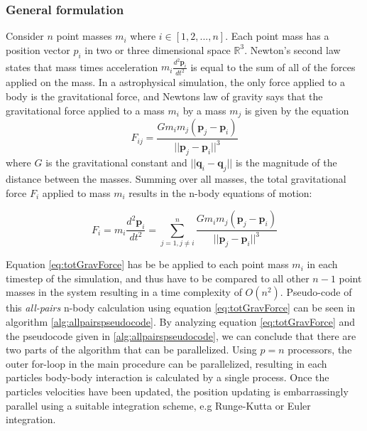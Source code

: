 \subsubsection{General formulation}
Consider $n$ point masses $m_i$ where $i \in [1, 2,..., n]$. Each point mass has a position vector $p_i$ in two or three dimensional space $\mathbb{R}^3$. 
Newton's second law states that mass times acceleration $m_i \frac{d^2 \boldsymbol p_i}{dt^2}$ is equal to the sum of all of the forces applied on the mass. In a astrophysical simulation, the only force applied to a body is the gravitational force, and Newtons law of gravity says that the gravitational force applied to a mass $m_i$ by a mass $m_j$ is given by the equation
\begin{equation}
    F_{ij} = \frac{G m_i m_j (\boldsymbol p_j - \boldsymbol p_i)}{|| \boldsymbol p_j - \boldsymbol p_i|| ^3}
\end{equation}
\noindent where $G$ is the gravitational constant and $|| \boldsymbol q_i - \boldsymbol q_j||$ is the magnitude of the distance between the masses. Summing over all masses, the total gravitational force $F_i$ applied to mass $m_i$ results in the n-body equations of motion:
 
\begin{equation} \label{eq:totGravForce}
    F_i = m_i\frac{d^2 \boldsymbol p_i}{dt^2} = \sum_{j=1, j\neq i}^n \frac{G m_i m_j (\boldsymbol p_j - \boldsymbol p_i)}{|| \boldsymbol p_j - \boldsymbol p_i|| ^3}
\end{equation}

Equation \ref{eq:totGravForce} has be be applied to each point mass $m_i$ in each timestep of the simulation, and thus have to be compared to all other $n-1$ point masses in the system resulting in a time complexity of $O(n^2)$. Pseudo-code of this \textit{all-pairs} n-body calculation using equation \ref{eq:totGravForce} can be seen in algorithm \ref{alg:allpairspseudocode}. By analyzing equation \ref{eq:totGravForce} and the pseudocode given in \ref{alg:allpairspseudocode}, we can conclude that there are two parts of the algorithm that can be parallelized. Using $p=n$ processors, the outer for-loop in the main procedure can be parallelized, resulting in each particles body-body interaction is calculated by a single process. Once the particles velocities have been updated, the position updating is embarrassingly parallel using a suitable integration scheme, e.g Runge-Kutta or Euler integration.

